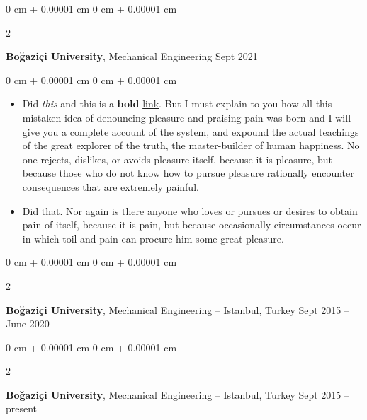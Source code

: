 \documentclass[10pt, letterpaper]{article}
\newenvironment{highlights}{
    \begin{itemize}[
        topsep=0.10 cm,
        parsep=0.10 cm,
        partopsep=0pt,
        itemsep=0pt,
        leftmargin=0 cm + 10pt
    ]
}{
    \end{itemize}
} %
\newenvironment{onecolentry}{
    \begin{adjustwidth}{
        0 cm + 0.00001 cm
    }{
        0 cm + 0.00001 cm
    }
}{
    \end{adjustwidth}
} %
\newenvironment{twocolentry}[2][]{
    \onecolentry
    \def\secondColumn{#2}
    \setcolumnwidth{\fill, 4.5 cm}
    \begin{paracol}{2}
}{
    \switchcolumn \raggedleft \secondColumn
    \end{paracol}
    \endonecolentry
} %
\begin{document}
        \vspace{0.2 cm}

        \begin{twocolentry}{
            Sept 2021
        }
            \textbf{Boğaziçi University}, Mechanical Engineering\end{twocolentry}

        \vspace{0.10 cm}
        \begin{onecolentry}
            \begin{highlights}
                \item Did \textit{this} and this is a \textbf{bold} \href{https://example.com}{link}. But I must explain to you how all this mistaken idea of denouncing pleasure and praising pain was born and I will give you a complete account of the system, and expound the actual teachings of the great explorer of the truth, the master-builder of human happiness. No one rejects, dislikes, or avoids pleasure itself, because it is pleasure, but because those who do not know how to pursue pleasure rationally encounter consequences that are extremely painful.
                \item Did that. Nor again is there anyone who loves or pursues or desires to obtain pain of itself, because it is pain, but because occasionally circumstances occur in which toil and pain can procure him some great pleasure.
            \end{highlights}
        \end{onecolentry}


        \vspace{0.2 cm}

        \begin{twocolentry}{
            Sept 2015 – June 2020
        }
            \textbf{Boğaziçi University}, Mechanical Engineering -- Istanbul, Turkey\end{twocolentry}



        \vspace{0.2 cm}

        \begin{twocolentry}{
            Sept 2015 – present
        }
            \textbf{Boğaziçi University}, Mechanical Engineering -- Istanbul, Turkey\end{twocolentry}
\end{document}

